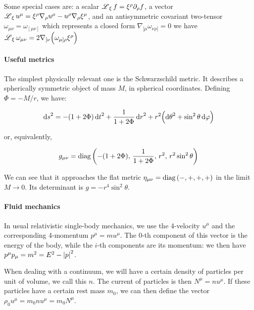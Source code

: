 \documentclass[main.tex]{subfiles}
\begin{document}
Some special cases are: a scalar \(\operatorname*{\mathscr L} _\xi f = \xi^\rho \partial_\rho f \), a vector \(\operatorname*{\mathscr L} _\xi u^\mu = \xi^\rho \nabla_\rho u^\mu -u^\rho \nabla_\rho \xi^\mu\), and  an antisymmetric covariant two-tensor \(\omega_{\mu\nu} = \omega_{[\mu \nu]}\) which represents a closed form \(\nabla_{[\mu} \omega_{\nu \rho]} = 0\) we have \(\operatorname*{\mathscr L} _\xi \omega_{\mu\nu} =2\nabla_{[\nu} \qty( \omega_{\mu] \rho} \xi^\rho )\)

\paragraph{Useful metrics}

The simplest physically relevant one is the Schwarzschild metric. It describes a spherically symmetric object of mass $M$, in spherical coordinates. Defining $\Phi = -M/r$, we have:

\begin{equation}
    \dd{s}^2 = -(1+2\Phi)\dd{t}^2 + \frac{1}{1+2\Phi} \dd{r}^2
    + r^2 \qty(\dd{\theta}^2 + \sin^2\theta \dd{\varphi}) \label{eq:schwartzshild-line-element}
\end{equation}

or, equivalently,

\begin{equation}
    g_{\mu\nu} =  \diag\qty(-(1+2\Phi),\, \frac{1}{1+2\Phi},\, r^2,\, r^2 \sin ^2 \theta )
\end{equation}

We can see that it approaches the flat metric $\eta_{\mu\nu} = \operatorname{diag}\qty(-, +, +, +)$ in the limit $M\rightarrow 0$. Its determinant is $g = -r^4 \sin^2 \theta$.

\paragraph{Fluid mechanics}

In usual relativistic single-body mechanics, we use the 4-velocity $u^\mu$ and the corresponding 4-momentum $p^\mu = m u^\mu$. The 0-th component of this vector is the energy of the body, while the $i$-th components are its momentum: we then have $p^\mu p_\mu = m^2 = E^2 - \abs{p}^2$.

When dealing with a continuum, we will have a certain density of particles per unit of volume, we call this $n$. The current of particles is then $N^\mu = n u^\mu$. If these particles have a certain rest mass $m_0$, we can then define the vector $\rho_0 u^\mu = m_0 n u^\mu = m_0 N^\mu$.
\end{document}
